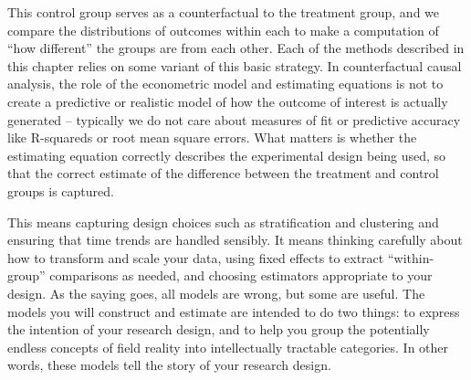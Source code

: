 This control group serves as a counterfactual to the treatment group,
and we compare the distributions of outcomes within each
to make a computation of ``how different'' the groups are from each other.
Each of the methods described in this chapter
relies on some variant of this basic strategy.
In counterfactual causal analysis,
the role of the econometric model and estimating equations
is not to create a predictive or realistic model
of how the outcome of interest is actually generated --
typically we do not care about measures of fit or predictive accuracy
like R-squareds or root mean square errors.
What matters is whether the estimating equation
correctly describes the experimental design being used,
so that the correct estimate of the difference
between the treatment and control groups is captured.

This means capturing design choices
such as stratification and clustering and
ensuring that time trends are handled sensibly.
It means thinking carefully about how to transform and scale your data,
using fixed effects to extract ``within-group'' comparisons as needed,
and choosing estimators appropriate to your design.
As the saying goes, all models are wrong, but some are useful.
The models you will construct and estimate are intended to do two things:
to express the intention of your research design,
and to help you group the potentially endless concepts of field reality
into intellectually tractable categories.
In other words, these models tell the story of your research design.


